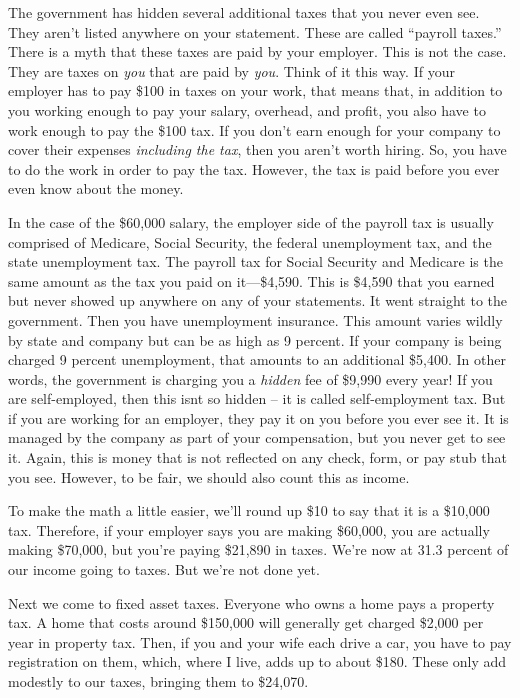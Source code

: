 \documentclass[letterpaper]{article}
\begin{document}
{\color{black}
The government has hidden several additional taxes that you never even
see. They aren’t listed anywhere on your statement. These are called
“payroll taxes.”  There is a myth that these taxes are paid by your
employer. This is not the case. They are taxes on \textit{you }that are
paid by\textit{ you}. Think of it this way. If your employer has to pay
\$100 in tax\textcolor[rgb]{0.32941177,0.5529412,0.83137256}{es} on
your work, that means that, in addition to you working enough to pay
your salary, overhead, and profit, you also have to work enough to pay
the \$100 tax. If you don’t earn enough for your company to cover their
expenses \textit{including the tax}, then you aren’t worth hiring. So,
you have to do the work in order to pay the tax. However, the tax is
paid before you ever even know about the money.}

{\color{black}
In the case of the \$60,000 salary, the employer side of the payroll tax
is usually comprised of Medicare, Social Security, the federal
unemployment tax, and the state unemployment tax. The payroll tax for
Social Security and Medicare is the same amount as the tax you paid on
it—\$4,590. This is \$4,590 that you earned but never showed up
anywhere on any of your statements. It went straight to the government.
Then you have unemployment insurance. This amount varies wildly by
state and company but can be as high as 9 percent. If your company is
being charged 9 percent unemployment, that amounts to an additional
\$5,400. In other words, the government is charging you a
\textit{hidden} fee of \$9,990 every year!  If you are self-employed,
then this isn{\textquotesingle}t so hidden – it is called
self-employment tax.  But if you are working for an employer, they pay
it on you before you ever see it.  It is managed by the company as part
of your compensation, but you never get to see it.  Again, this is
money that is not reflected on any check, form, or pay stub that you
see. However, to be fair, we should also count this as income.}

{\color{black}
To make the math a little easier, we’ll round up \$10 to say that it is
a \$10,000 tax. Therefore, if your employer says you are making
\$60,000, you are actually making \$70,000, but you’re paying \$21,890
in taxes. We’re now at 31.3 percent of our income going to taxes. But
we’re not done yet.}

{\color{black}
Next we come to fixed asset taxes. Everyone who owns a home pays a
property tax. A  home that costs around \$150,000 will generally get
charged \$2,000 per year in property tax. Then, if you and your wife
each drive a car, you have to pay registration on them, which, where I
live, adds up to about \$180. These only add modestly to our taxes,
bringing them to \$24,070.}
\end{document}
